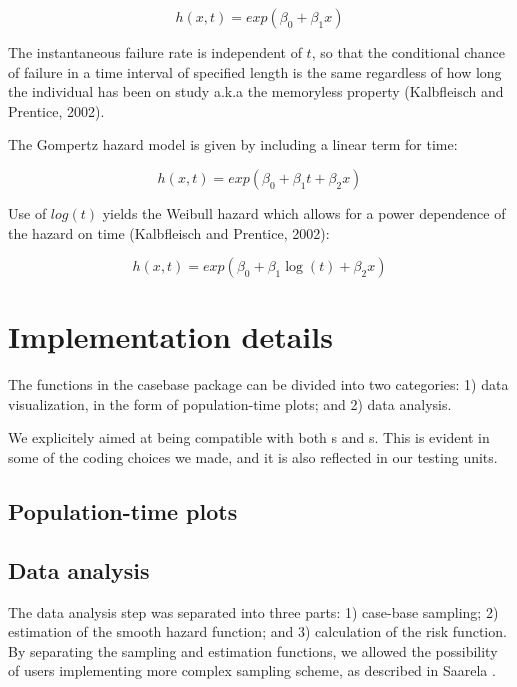 \documentclass[
]{jss}
\begin{document}
\[ h(x,t) = exp(\beta_0 + \beta_1 x) \]

The instantaneous failure rate is independent of \(t\), so that the
conditional chance of failure in a time interval of specified length is
the same regardless of how long the individual has been on study a.k.a
the memoryless property (Kalbfleisch and Prentice, 2002).

The Gompertz hazard model is given by including a linear term for time:

\[ h(x,t)  = exp(\beta_0 + \beta_1 t + \beta_2 x) \]

Use of \(log(t)\) yields the Weibull hazard which allows for a power
dependence of the hazard on time (Kalbfleisch and Prentice, 2002):

\[ h(x, t)  = exp(\beta_0 + \beta_1 \log(t) + \beta_2 x) \]

\hypertarget{implementation-details}{%
\section{Implementation details}\label{implementation-details}}

The functions in the casebase package can be divided into two
categories: 1) data visualization, in the form of population-time plots;
and 2) data analysis.

We explicitely aimed at being compatible with both s
and s. This is evident in some of the coding choices we
made, and it is also reflected in our testing units.

\hypertarget{population-time-plots}{%
\subsection{Population-time plots}\label{population-time-plots}}

\hypertarget{data-analysis}{%
\subsection{Data analysis}\label{data-analysis}}

The data analysis step was separated into three parts: 1) case-base
sampling; 2) estimation of the smooth hazard function; and 3)
calculation of the risk function. By separating the sampling and
estimation functions, we allowed the possibility of users implementing
more complex sampling scheme, as described in Saarela
\citeyearpar{saarela2016case}.
\end{document}
